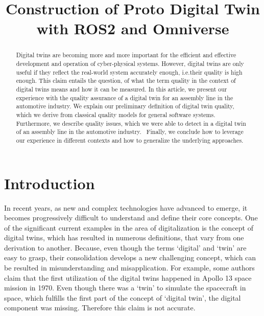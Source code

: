 \documentclass[conference]{IEEEtran}
\begin{document}
    \title{Construction of Proto Digital Twin with ROS2 and Omniverse}
    \author{ 
    \and 
    }
   
    \maketitle

    \begin{abstract}
        Digital twins are becoming more and more important for the efficient and effective development and operation of cyber-physical systems.
        However, digital twins are only useful if they reflect the real-world system accurately enough, i.e.their quality is high enough. 
        This claim entails the question, of what the term quality in the context of digital twins means and how it can be measured. 
        In this article, we present our experience with the quality assurance of a digital twin for an assembly line in the automotive industry.
        We explain our preliminary definition of digital twin quality, which we derive from classical quality models for general software systems. 
        Furthermore, we describe quality issues, which we were able to detect in a digital twin of an assembly line in the automotive industry. \
        Finally, we conclude how to leverage our experience in different contexts and how to generalize the underlying approaches.
    \end{abstract}

    \section{Introduction}\label{section:introduction}
    In recent years, as new and complex technologies have advanced to emerge, it becomes progressively 
    difficult to understand and define their core concepts. One of the significant current examples in the 
    area of digitalization is the concept of digital twins, which has resulted in numerous definitions, that vary 
    from one derivation to another. Because, even though the terms `digital' and `twin' are easy to grasp,  their 
    consolidation develops a new challenging concept, which can be resulted in misunderstanding and misapplication. For example, 
    some authors claim that the first utilization of the digital twins 
    happened in Apollo 13 space mission in 1970. Even though there was a `twin'  to simulate the spacecraft in space, which fulfills the first part of the concept of 
    `digital twin', the digital component was missing. Therefore this claim is not accurate.
    
\end{document}
